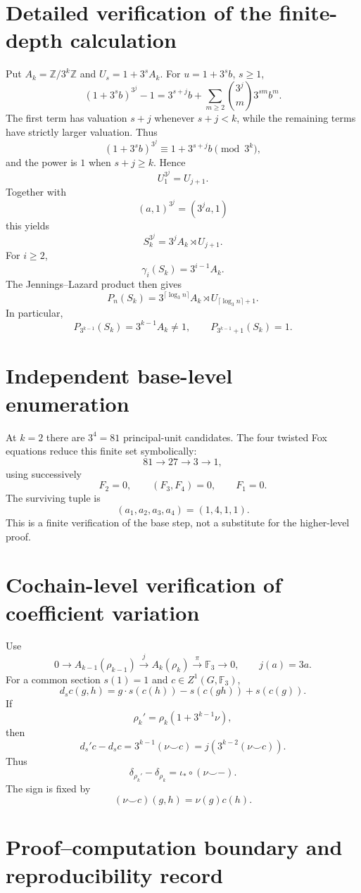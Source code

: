 \documentclass[11pt]{article}
\begin{document}
\section{Detailed verification of the finite-depth calculation}

Put $A_k=\mathbb Z/3^k\mathbb Z$ and $U_s=1+3^sA_k$.
For $u=1+3^sb$, $s\ge1$,
\[
(1+3^sb)^{3^j}-1
=
3^{s+j}b+\sum_{m\ge2}\binom{3^j}{m}3^{sm}b^m.
\]
The first term has valuation $s+j$ whenever $s+j<k$, while the remaining
terms have strictly larger valuation. Thus
\[
(1+3^sb)^{3^j}\equiv1+3^{s+j}b\pmod{3^k},
\]
and the power is $1$ when $s+j\ge k$. Hence
\[
U_1^{3^j}=U_{j+1}.
\]
Together with
\[
(a,1)^{3^j}=(3^ja,1)
\]
this yields
\[
S_k^{3^j}=3^jA_k\rtimes U_{j+1}.
\]
For $i\ge2$,
\[
\gamma_i(S_k)=3^{i-1}A_k.
\]
The Jennings--Lazard product then gives
\[
P_n(S_k)=3^{\lceil\log_3n\rceil}A_k
\rtimes U_{\lceil\log_3n\rceil+1}.
\]
In particular,
\[
P_{3^{k-1}}(S_k)=3^{k-1}A_k\ne1,
\qquad
P_{3^{k-1}+1}(S_k)=1.
\]

\section{Independent base-level enumeration}

At $k=2$ there are $3^4=81$ principal-unit candidates. The four
twisted Fox equations reduce this finite set symbolically:
\[
81\longrightarrow27\longrightarrow3\longrightarrow1,
\]
using successively
\[
F_2=0,\qquad (F_3,F_4)=0,\qquad F_1=0.
\]
The surviving tuple is
\[
(a_1,a_2,a_3,a_4)=(1,4,1,1).
\]
This is a finite verification of the base step, not a substitute for the
higher-level proof.

\section{Cochain-level verification of coefficient variation}

Use
\[
0\to A_{k-1}(\rho_{k-1})
\xrightarrow{j}A_k(\rho_k)
\xrightarrow{\pi}\mathbb F_3\to0,
\qquad j(a)=3a.
\]
For a common section $s(1)=1$ and
$c\in Z^1(G,\mathbb F_3)$,
\[
d_sc(g,h)=g\!\cdot s(c(h))-s(c(gh))+s(c(g)).
\]
If
\[
\rho_k'=\rho_k(1+3^{k-1}\nu),
\]
then
\[
d_s'c-d_sc=3^{k-1}(\nu\smile c)
=j\!\left(3^{k-2}(\nu\smile c)\right).
\]
Thus
\[
\delta_{\rho_k'}-\delta_{\rho_k}
=
\iota_*\circ(\nu\smile-).
\]
The sign is fixed by
\[
(\nu\smile c)(g,h)=\nu(g)c(h).
\]

\section{Proof--computation boundary and reproducibility record}
\end{document}
